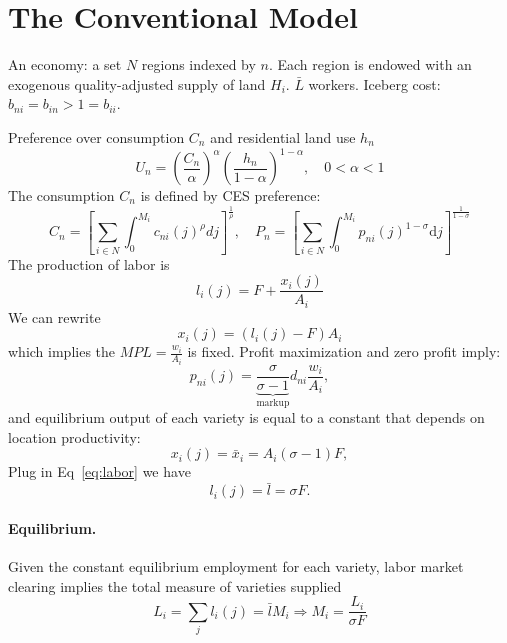 \documentclass[11pt,a4paper]{article}
\begin{document}
\section{The Conventional Model}
An economy: a set $N$ regions indexed by $n$. Each region is endowed with an exogenous quality-adjusted supply of land $H_i$. $\bar{L}$ workers. Iceberg cost: $b_{ni} = b_{in}>1= b_{ii}$. 

Preference over consumption $C_n$ and residential land use $h_n$
\begin{equation}
    U_n = \left( \frac{C_n}{\alpha } \right)^{\alpha } \left( \frac{h_n}{1-\alpha } \right)^{1-\alpha },\quad 0<\alpha <1
\end{equation}
The consumption $C_n$ is defined by CES preference:
\begin{equation}
    C_n = \left[ \sum_{i \in N} \int_{0}^{M_i} c_{ni}(j)^\rho d j\right]^{\frac{1}{\rho}},\quad P_n = \left[ \sum_{i \in N} \int_{0}^{M_i} p_{ni}(j)^{1-\sigma } \mathrm{d} j\right]^{\frac{1}{1-\sigma}}\label{eq:pn}
\end{equation}
The production of labor is 
\begin{equation}
  l_i (j ) = F + \frac{x_i(j)}{A_i}\label{eq:labor}
\end{equation}
We can rewrite $$ x_i(j) = (l_i(j)-F)A_i $$ which implies the $MPL = \frac{w_i}{A_i}$ is fixed. 
Profit maximization and zero profit imply: 
\begin{equation}
  p_{ni}(j) = \underbrace{\frac{\sigma }{\sigma -1}}_{\text{markup}} d_{ni} \frac{w_i}{A_i},\label{eq:pnij}
\end{equation}
and equilibrium output of each variety is equal to a constant that depends on location productivity:
\begin{equation}
  x_i (j) = \bar{x}_i = A_i (\sigma -1) F,
\end{equation}
Plug in Eq~\eqref{eq:labor} we have
\begin{equation}
  l_i (j ) =  \bar{l} = \sigma F.
\end{equation}
\paragraph{Equilibrium.} Given the constant equilibrium employment for each variety, labor market clearing implies the total measure of varieties supplied
\begin{equation}
  L_i = \sum_{j}^{} l_i (j) = \bar{l} M_i \Rightarrow M_i = \frac{L_i}{\sigma F}\label{eq:li}
\end{equation}
\end{document}
